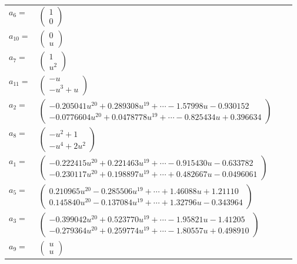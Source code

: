 \documentclass[1p]{elsarticle_modified}
\theoremstyle{definition}
\begin{document}
\begin{tabular}{m{7pt} m{180pt} m{7pt} m{180pt} }
\flushright $a_{6}=$&$\begin{pmatrix}1\\0\end{pmatrix}$ \\
\flushright $a_{10}=$&$\begin{pmatrix}0\\u\end{pmatrix}$ \\
\flushright $a_{7}=$&$\begin{pmatrix}1\\u^2\end{pmatrix}$ \\
\flushright $a_{11}=$&$\begin{pmatrix}- u\\- u^3+u\end{pmatrix}$ \\
\flushright $a_{2}=$&$\begin{pmatrix}-0.205041 u^{20}+0.289308 u^{19}+\cdots-1.57998 u-0.930152\\-0.0776604 u^{20}+0.0478778 u^{19}+\cdots-0.825434 u+0.396634\end{pmatrix}$ \\
\flushright $a_{8}=$&$\begin{pmatrix}- u^2+1\\- u^4+2 u^2\end{pmatrix}$ \\
\flushright $a_{1}=$&$\begin{pmatrix}-0.222415 u^{20}+0.221463 u^{19}+\cdots-0.915430 u-0.633782\\-0.230117 u^{20}+0.198897 u^{19}+\cdots+0.482667 u-0.0496061\end{pmatrix}$ \\
\flushright $a_{5}=$&$\begin{pmatrix}0.210965 u^{20}-0.285506 u^{19}+\cdots+1.46088 u+1.21110\\0.145840 u^{20}-0.137084 u^{19}+\cdots+1.32796 u-0.343964\end{pmatrix}$ \\
\flushright $a_{3}=$&$\begin{pmatrix}-0.399042 u^{20}+0.523770 u^{19}+\cdots-1.95821 u-1.41205\\-0.279364 u^{20}+0.259774 u^{19}+\cdots-1.80557 u+0.498910\end{pmatrix}$ \\
\flushright $a_{9}=$&$\begin{pmatrix}u\\u\end{pmatrix}$ \\

\end{tabular}
\end{document}
